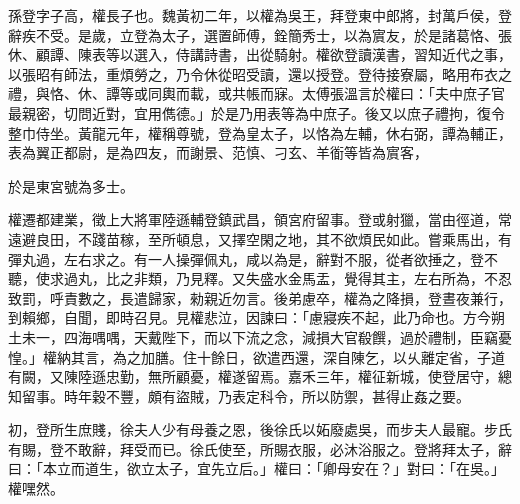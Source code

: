 \begin{pinyinscope}
 
 
 孫登字子高，權長子也。魏黃初二年，以權為吳王，拜登東中郎將，封萬戶侯，登辭疾不受。是歲，立登為太子，選置師傅，銓簡秀士，以為賔友，於是諸葛恪、張休、顧譚、陳表等以選入，侍講詩書，出從騎射。權欲登讀漢書，習知近代之事，以張昭有師法，重煩勞之，乃令休從昭受讀，還以授登。登待接寮屬，略用布衣之禮，與恪、休、譚等或同輿而載，或共帳而寐。太傅張溫言於權曰：「夫中庶子官最親密，切問近對，宜用儁德。」於是乃用表等為中庶子。後又以庶子禮拘，復令整巾侍坐。黃龍元年，權稱尊號，登為皇太子，以恪為左輔，休右弼，譚為輔正，表為翼正都尉，是為四友，而謝景、范慎、刁玄、羊衜等皆為賔客，
 
 
 於是東宮號為多士。
 
 
 
 
 權遷都建業，徵上大將軍陸遜輔登鎮武昌，領宮府留事。登或射獵，當由徑道，常遠避良田，不踐苗稼，至所頓息，又擇空閑之地，其不欲煩民如此。嘗乘馬出，有彈丸過，左右求之。有一人操彈佩丸，咸以為是，辭對不服，從者欲捶之，登不聽，使求過丸，比之非類，乃見釋。又失盛水金馬盂，覺得其主，左右所為，不忍致罰，呼責數之，長遣歸家，勑親近勿言。後弟慮卒，權為之降損，登晝夜兼行，到賴鄉，自聞，即時召見。見權悲泣，因諫曰：「慮寢疾不起，此乃命也。方今朔土未一，四海喁喁，天戴陛下，而以下流之念，減損大官殽饌，過於禮制，臣竊憂惶。」權納其言，為之加膳。住十餘日，欲遣西還，深自陳乞，以乆離定省，子道有闕，又陳陸遜忠勤，無所顧憂，權遂留焉。嘉禾三年，權征新城，使登居守，總知留事。時年穀不豐，頗有盜賊，乃表定科令，所以防禦，甚得止姦之要。
 
 
初，登所生庶賤，徐夫人少有母養之恩，後徐氏以妬廢處吳，而步夫人最寵。步氏有賜，登不敢辭，拜受而已。徐氏使至，所賜衣服，必沐浴服之。登將拜太子，辭曰：「本立而道生，欲立太子，宜先立后。」權曰：「卿母安在？」對曰：「在吳。」權嘿然。
 

\end{pinyinscope}
